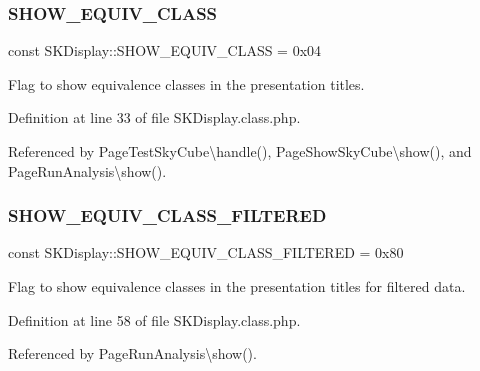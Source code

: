 \subsubsection{\texorpdfstring{S\+H\+O\+W\+\_\+\+E\+Q\+U\+I\+V\+\_\+\+C\+L\+A\+SS}{SHOW\_EQUIV\_CLASS}}
{\footnotesize\ttfamily const S\+K\+Display\+::\+S\+H\+O\+W\+\_\+\+E\+Q\+U\+I\+V\+\_\+\+C\+L\+A\+SS = 0x04}

Flag to show equivalence classes in the presentation titles. 

Definition at line 33 of file S\+K\+Display.\+class.\+php.



Referenced by Page\+Test\+Sky\+Cube\textbackslash{}handle(), Page\+Show\+Sky\+Cube\textbackslash{}show(), and Page\+Run\+Analysis\textbackslash{}show().

\mbox{\label{class_s_k_display_aaa3189f31f22a2b1f23a47c1bcdf2337}} 
\subsubsection{\texorpdfstring{S\+H\+O\+W\+\_\+\+E\+Q\+U\+I\+V\+\_\+\+C\+L\+A\+S\+S\+\_\+\+F\+I\+L\+T\+E\+R\+ED}{SHOW\_EQUIV\_CLASS\_FILTERED}}
{\footnotesize\ttfamily const S\+K\+Display\+::\+S\+H\+O\+W\+\_\+\+E\+Q\+U\+I\+V\+\_\+\+C\+L\+A\+S\+S\+\_\+\+F\+I\+L\+T\+E\+R\+ED = 0x80}

Flag to show equivalence classes in the presentation titles for filtered data. 

Definition at line 58 of file S\+K\+Display.\+class.\+php.



Referenced by Page\+Run\+Analysis\textbackslash{}show().

\mbox{\label{class_s_k_display_a76b4f1df0ee307907d0b7585e8acca26}} 
